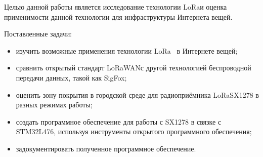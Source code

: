 Целью данной работы является исследование технологии LoRa\texttrademark и 
оценка применимости 
данной технологии для инфраструктуры Интернета вещей.

Поставленные задачи:
\begin{itemize}
	\item изучить возможные применения технологии LoRa\texttrademark~ в
Интернете вещей;
	\item сравнить открытый стандарт LoRaWAN\texttrademark с другой 
технологией
беспроводной передачи данных, такой как SigFox;
	\item оценить зону покрытия в городской среде для 
радиоприёмника LoRa\texttrademark SX1278 в разных режимах работы;
	\item создать программное обеспечение для работы с SX1278 в связке с
STM32L476, используя инструменты открытого программного обеспечения;
	\item задокументировать полученное программное обеспечение.
\end{itemize}



